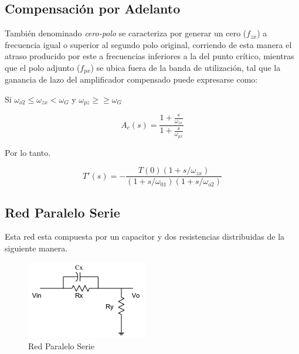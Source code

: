 \newpage
\subsection{Compensación por Adelanto}

\hspace{1mm} También denominado \textit{cero-polo} se caracteriza por generar un cero (\( f_{zx} \)) a frecuencia igual o superior al segundo polo original, corriendo de esta manera el atraso producido por este a frecuencias inferiores a la del punto crítico, mientras que el polo adjunto (\( f_{px} \)) se ubica fuera de la banda de utilización, tal que la ganancia de lazo del amplificador compensado puede expresarse como:

\bigskip
\hspace{1mm} Si \( \omega _{o2} \leq \omega _{zx} < \omega _G \) y \( \omega _{pz} \geq \geq \omega _G \)

\begin{equation}
    A_c (s) = \frac{1 + \frac{s}{\omega _{zx}}}{1 + \frac{s}{\omega _{px}}}
\end{equation}

\bigskip
\hspace{1mm} Por lo tanto.

\begin{equation}
    T'(s) = - \frac{T(0) (1 + s/\omega _{zx})}{(1 + s/ \omega _{01})(1 + s/ \omega _{o2})}
\end{equation}

\subsection{Red Paralelo Serie}

\bigskip
\hspace{1mm} Esta red esta compuesta por un capacitor y dos resistencias distribuidas de la siguiente manera.

\bigskip
\begin{figure}[!h]
    \centering
    \includegraphics[scale=1]{img/Red paralelo serie.png}
    \caption{Red Paralelo Serie}
\end{figure}

